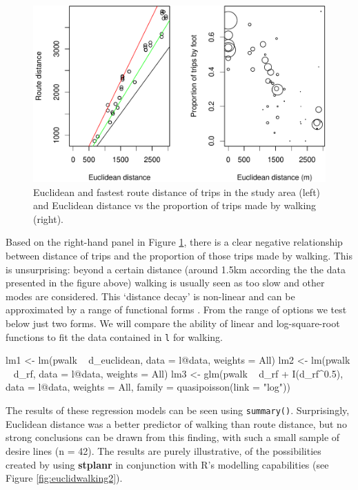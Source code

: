 \begin{Schunk}
\begin{figure}
\includegraphics[width=1\linewidth]{euclidfastest-1} \caption[Euclidean and fastest route distance of trips in the study area (left) and Euclidean distance vs the proportion of trips made by walking (right)]{Euclidean and fastest route distance of trips in the study area (left) and Euclidean distance vs the proportion of trips made by walking (right).}\label{fig:euclidfastest}
\end{figure}
\end{Schunk}

Based on the right-hand panel in Figure \ref{fig:euclidfastest}, there
is a clear negative relationship between distance of trips and the
proportion of those trips made by walking. This is unsurprising: beyond
a certain distance (around 1.5km according the the data presented in the
figure above) walking is usually seen as too slow and other modes are
considered.
This `distance decay' is non-linear and can be approximated by a range of functional forms \citep{martinez_new_2013}.
From the range of
options we test below just two forms. We will compare the ability of
linear and log-square-root functions to fit the data contained in
\texttt{l} for walking.

\begin{Schunk}
\begin{Sinput}
lm1 <- lm(pwalk ~ d_euclidean, data = l@data, weights = All)
lm2 <- lm(pwalk ~ d_rf, data = l@data, weights = All)
lm3 <- glm(pwalk ~ d_rf + I(d_rf^0.5),
           data = l@data, weights = All, family = quasipoisson(link = "log"))
\end{Sinput}
\end{Schunk}

The results of these regression models can be seen using
\texttt{summary()}. Surprisingly, Euclidean distance was a better
predictor of walking than route distance, but no strong conclusions can
be drawn from this finding, with such a small sample of desire lines (n
= 42). The results are purely illustrative, of the
possibilities created by using \textbf{stplanr} in conjunction with R's
modelling capabilities (see Figure \vref{fig:euclidwalking2}).

